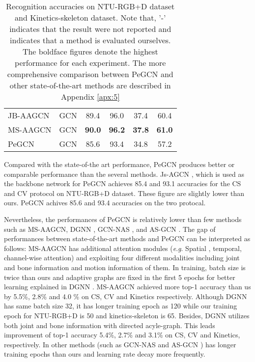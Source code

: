 \documentclass[runningheads]{llncs}
\newcommand{\eg}{\textit{e}.\textit{g}. }
\begin{document}
\begin{wraptable}{r}{60mm}
{\begin{tabular}{l c c c c c }
		\multicolumn{1}{l}{JB-AAGCN \cite{shi2019multi}} &GCN & 89.4  & 96.0  & 37.4 & 60.4  \\
		\multicolumn{1}{l}{MS-AAGCN \cite{shi2019multi}} &GCN & \textbf{90.0}  & \textbf{96.2 } & \textbf{37.8} & \textbf{61.0}  \\
	    \midrule
		\multicolumn{1}{l}{PeGCN} & GCN & 85.6 &  93.4 &  34.8 &	57.2 \\
		\midrule
		\bottomrule
	\end{tabular}
    }
	\caption{Recognition accuracies on NTU-RGB+D dataset and Kinetics-skeleton dataset. Note that, '-' indicates that the result were not reported and  indicates that a method is evaluated ourselves. The boldface figures denote the highest performance for each experiment. The more comprehensive comparison between PeGCN and other state-of-the-art methods are described in Appendix \ref{apx:5}}
	\label{tab:normal}
	\vspace{-4ex}
\end{wraptable}

Compared with the state-of-the art performance, PeGCN produces better or comparable performance than the several methods. Js-AGCN \cite{shi2019two}, which is used as the backbone network for PeGCN achieves 85.4 and 93.1 accuracies for the CS and CV protocol on NTU-RGB+D dataset. These figure are slightly lower than ours. PeGCN achives 85.6 and 93.4 accuracies on the two protocal. 


Nevertheless, the performances of PeGCN is relatively lower than few methods such as MS-AAGCN\cite{shi2019multi}, DGNN \cite{shi2019skeleton}, GCN-NAS \cite{peng2019learning}, and AS-GCN \cite{li2019actional}.  The gap of performances between state-of-the-art methods and PeGCN can be interpreted as follows: MS-AAGCN\cite{shi2019multi} has additional attention modules (\eg Spatial , temporal, channel-wise attention) and exploiting four different modalities including joint and bone information and motion information of them. In training, batch size is twice than ours and adaptive graphs are fixed in the first 5 epochs for better learning explained in DGNN \cite{shi2019skeleton}. MS-AAGCN  achieved more top-1 accuracy than us by 5.5\%, 2.8\% and 4.0 \%  on CS, CV and Kinetics respectively. Although DGNN \cite{shi2019skeleton} has same batch size 32, it has longer training epoch as 120 while our training epoch for NTU-RGB+D is 50 and kinetics-skeleton is 65. Besides, DGNN utilizes both joint and bone information with directed acyle-graph. This leads improvement of top-1 accuracy 5.4\%, 2.7\% and 3.1\% on CS, CV and Kinetics, respectively. In other methods (such as GCN-NAS \cite{peng2019learning} and AS-GCN \cite{li2019actional}) has longer training epochs than ours and learning rate decay more frequently. 
\end{document}
